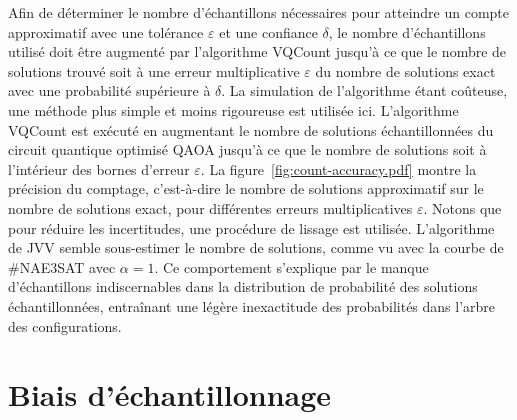 Afin de déterminer le nombre d'échantillons nécessaires pour atteindre un compte approximatif avec une tolérance $\varepsilon$ et une confiance $\delta$, le nombre d'échantillons utilisé doit être augmenté par l'algorithme VQCount jusqu'à ce que le nombre de solutions trouvé soit à une erreur multiplicative $\varepsilon$ du nombre de solutions exact avec une probabilité supérieure à $\delta$. La simulation de l'algorithme étant coûteuse, une méthode plus simple et moins rigoureuse est utilisée ici. L'algorithme VQCount est exécuté en augmentant le nombre de solutions échantillonnées du circuit quantique optimisé QAOA jusqu'à ce que le nombre de solutions soit à l'intérieur des bornes d'erreur $\varepsilon$. La figure~\ref{fig:count-accuracy.pdf} montre la précision du comptage, c'est-à-dire le nombre de solutions approximatif sur le nombre de solutions exact, pour différentes erreurs multiplicatives $\varepsilon$. Notons que pour réduire les incertitudes, une procédure de lissage est utilisée. L'algorithme de JVV semble sous-estimer le nombre de solutions, comme vu avec la courbe de \#NAE3SAT avec $\alpha = 1$. Ce comportement s'explique par le manque d'échantillons indiscernables dans la distribution de probabilité des solutions échantillonnées, entraînant une légère inexactitude des probabilités dans l'arbre des configurations. 



\section{Biais d'échantillonnage}
\label{sec:biais-echantillonnage}

